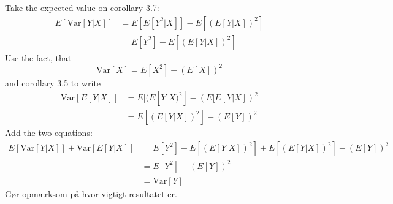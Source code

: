\documentclass[12pt,a4paper]{report}
\begin{document}
Take the expected value on corollary 3.7:
\begin{align*}
E[\text{Var}[Y|X]]&=E[E[Y^2|X]]-E[(E[Y|X])^2]\\
&=E[Y^2]-E[(E[Y|X])^2]
\end{align*}
Use the fact, that
\begin{equation}
\text{Var}[X]=E[X^2]-(E[X])^2
\end{equation}
and corollary 3.5 to write
\begin{align*}
\text{Var}[E[Y|X]]&=E[(E[Y|X)^2]-(E[E[Y|X])^2\\
&=E[(E[Y|X])^2]-(E[Y])^2
\end{align*}
Add the two equations:
\begin{align*}
E[\text{Var}[Y|X]]+\text{Var}[E[Y|X]]&=E[Y^2]-E[(E[Y|X])^2]+E[(E[Y|X])^2]-(E[Y])^2\\
&=E[Y^2]-(E[Y])^2\\
&=\text{Var}[Y]
\end{align*}
Gør opmærksom på hvor vigtigt resultatet er.
\end{document}
